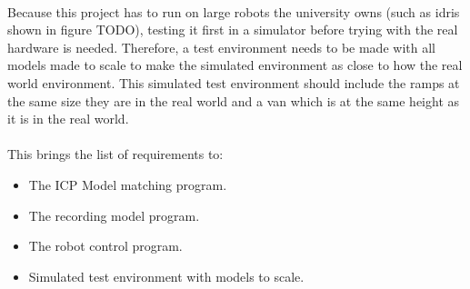 \paragraph{}
Because this project has to run on large robots the university owns (such as idris shown in figure TODO), testing it first in a simulator before trying with the real hardware is needed. Therefore, a test environment needs to be made with all models made to scale to make the simulated environment as close to how the real world environment. This simulated test environment should include the ramps at the same size they are in the real world and a van which is at the same height as it is in the real world.
\paragraph{}
This brings the list of requirements to:
\begin{itemize}
  \item The ICP Model matching program.
  \item The recording model program.
  \item The robot control program.
  \item Simulated test environment with models to scale.
\end{itemize}



